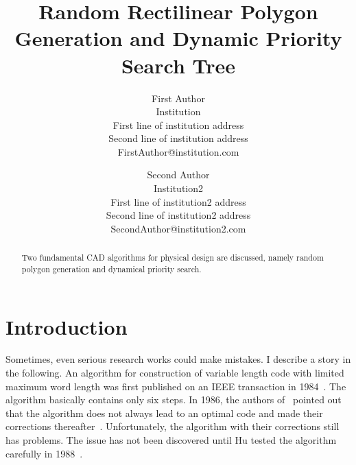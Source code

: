 \documentclass{acm_proc_article-sp}          %
\begin{document}
\title{Random Rectilinear Polygon Generation and Dynamic Priority
  Search Tree}

\author{First Author\\
Institution\\
First line of institution address\\ Second line of institution address\\ 
FirstAuthor@institution.com\\
\and
Second Author\\
Institution2\\
First line of institution2 address\\ Second line of institution2 address\\ 
SecondAuthor@institution2.com\\
}

\maketitle
\thispagestyle{empty}

\begin{abstract}
Two fundamental CAD algorithms for physical design are discussed,
namely random polygon generation and dynamical priority search. 
\end{abstract}


\section{Introduction}
\label{sec:intro}
Sometimes, even serious research works could make mistakes. 
I describe a story in the following. 
An algorithm for construction of variable
length code with limited maximum word length was first published on an
IEEE transaction in 1984~\cite{vl-code-84}. 
The algorithm basically contains only six steps. 
In 1986, the authors of~\cite{vl-code-86} pointed out that the
algorithm does not always lead to an optimal code and made their
corrections thereafter~\cite{vl-code-86}. 
Unfortunately, the algorithm with their corrections still has
problems. The issue has not been discovered until Hu
tested the algorithm carefully in 1988~\cite{vl-code-88}.

\end{document}
